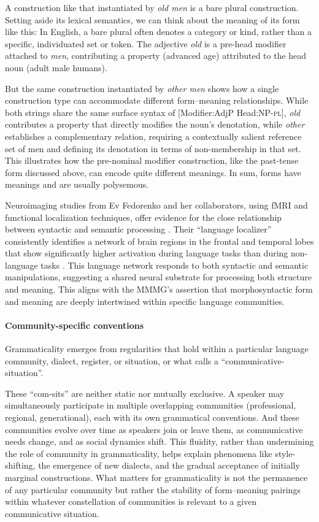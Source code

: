 \documentclass[12pt,letterpaper]{article}
\begin{document}
A construction like that instantiated by \textit{old men} is a bare plural construction. Setting aside its lexical semantics, we can think about the meaning of its form like this: In English, a bare plural often denotes a category or kind, rather than a specific, individuated set or token. The adjective \textit{old} is a pre-head modifier attached to \textit{men}, contributing a property (advanced age) attributed to the head noun (adult male humans).

But the same construction instantiated by \textit{other men} shows how a single construction type can accommodate different form--meaning relationships. While both strings share the same surface syntax of [Modifier:AdjP Head:NP-\textsc{pl}], \textit{old} contributes a property that directly modifies the noun's denotation, while \textit{other} establishes a complementary relation, requiring a contextually salient reference set of men and defining its denotation in terms of non-membership in that set. This illustrates how the pre-nominal modifier construction, like the past-tense form discussed above, can encode quite different meanings. In sum, forms have meanings and are usually polysemous.

Neuroimaging studies from Ev Fedorenko and her collaborators, using fMRI and functional localization techniques, offer evidence for the close relationship between syntactic and semantic processing \autocite{Fedorenko2011, Fedorenko2012, Fedorenko2024}. Their ``language localizer'' consistently identifies a network of brain regions in the frontal and temporal lobes that show significantly higher activation during language tasks than during non-language tasks \autocite{Fedorenko2010,}. This language network responds to both syntactic and semantic manipulations, suggesting a shared neural substrate for processing both structure and meaning. This aligns with the MMMG's assertion that morphosyntactic form and meaning are deeply intertwined within specific language communities.

\paragraph{Community-specific conventions}

Grammaticality emerges from regularities that hold within a particular language community, dialect, register, or situation, or what \textcite[3]{wiese2023} calls a ``communicative-situation''.

These ``com-sits'' are neither static nor mutually exclusive. A speaker may simultaneously participate in multiple overlapping communities (professional, regional, generational), each with its own grammatical conventions. And these communities evolve over time as speakers join or leave them, as communicative needs change, and as social dynamics shift. This fluidity, rather than undermining the role of community in grammaticality, helps explain phenomena like style-shifting, the emergence of new dialects, and the gradual acceptance of initially marginal constructions. What matters for grammaticality is not the permanence of any particular community but rather the stability of form--meaning pairings within whatever constellation of communities is relevant to a given communicative situation.
\end{document}
